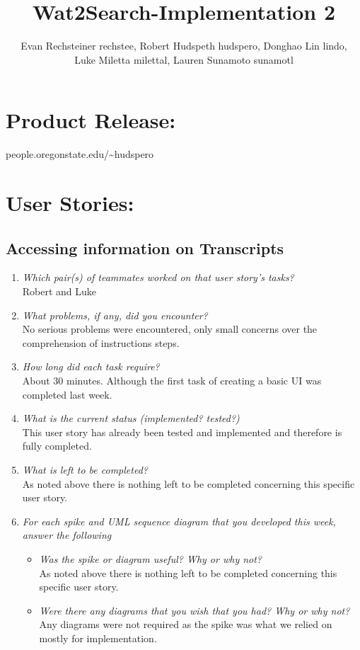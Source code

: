 \documentclass[12pt, letterpaper]{article}
\title{Wat2Search-Implementation 2}
\author{Evan Rechsteiner rechstee, Robert Hudspeth hudspero, Donghao Lin lindo, \\Luke Miletta milettal, Lauren Sunamoto sunamotl 
}
\begin{document}
	\maketitle
	\section{Product Release:}
	people.oregonstate.edu/\textasciitilde hudspero
	\section{User Stories:}
	   \subsection{Accessing information on Transcripts}
	   \begin{enumerate}
	   	\item \emph{Which pair(s) of teammates worked on that user story's tasks?}
	   	\\Robert and Luke
	   	\item \emph{What problems, if any, did you encounter?}
	   	\\No serious problems were encountered, only small concerns over the comprehension of instructions steps.
	   	\item \emph{How long did each task require?}
	   	\\About 30 minutes.  Although the first task of creating a basic UI was completed last week.
	   	\item \emph{What is the current status (implemented? tested?)}
	   	\\This user story has already been tested and implemented and therefore is fully completed.
	   	\item \emph{What is left to be completed?}
	   	\\ As noted above there is nothing left to be completed concerning this specific user story.
	   	\item \emph{For each spike and UML sequence diagram that you developed this week, answer the following}
	   	\begin{itemize}
	   		\item \emph{Was the spike or diagram useful? Why or why not?}
	   		\\ As noted above there is nothing left to be completed concerning this specific user story.
	   		\item \emph{Were there any diagrams that you wish that you had? Why or why not?}
	   		\\Any diagrams were not required as the spike was what we relied on mostly for implementation.
	   	\end{itemize}
		\end{enumerate}
	   
\end{document}
